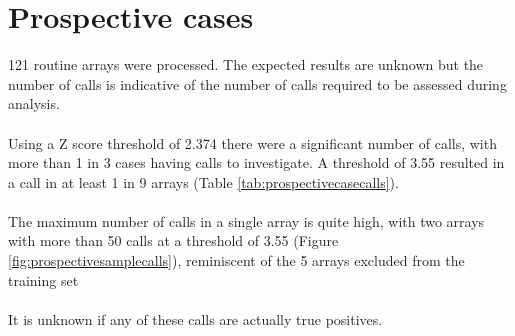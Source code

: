 \section{Prospective cases}
121 routine arrays were processed. The expected results are unknown but the number of calls is indicative of the number of calls required to be assessed during analysis.
\paragraph*{}
Using a Z score threshold of 2.374 there were a significant number of calls, with more than 1 in 3 cases having calls to investigate. A threshold of 3.55 resulted in a call in at least 1 in 9 arrays (Table \ref{tab:prospectivecasecalls}).
\paragraph*{}
The maximum number of calls in a single array is quite high, with two arrays with more than 50 calls at a threshold of 3.55 (Figure \ref{fig:prospectivesamplecalls}), reminiscent of the 5 arrays excluded from the training set
\paragraph*{}
It is unknown if any of these calls are actually true positives.

